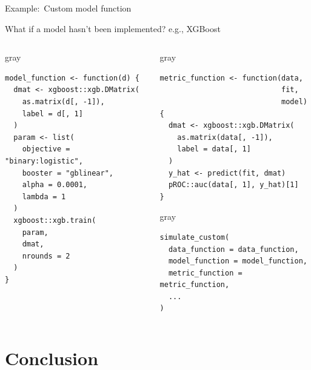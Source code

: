 \documentclass[11pt]{beamer}
\begin{document}
\begin{frame}[c,fragile]{Example:\ Custom model function}

	What if a model hasn't been implemented? e.g., XGBoost \vspace{-0.5em}%

	\begin{columns}
		\begin{column}[T]{0.5\textwidth}
			\begin{cbox}{gray}{}%
				\begin{verbatim}
model_function <- function(d) {
  dmat <- xgboost::xgb.DMatrix(
    as.matrix(d[, -1]),
    label = d[, 1]
  )
  param <- list(
    objective = "binary:logistic",
    booster = "gblinear",
    alpha = 0.0001,
    lambda = 1
  )
  xgboost::xgb.train(
    param,
    dmat,
    nrounds = 2
  )
}
            \end{verbatim}
			\end{cbox}

		\end{column}
		\begin{column}[T]{0.55\textwidth}
			\begin{cbox}{gray}{}%
				\begin{verbatim}
metric_function <- function(data,
                            fit,
                            model) {
  dmat <- xgboost::xgb.DMatrix(
    as.matrix(data[, -1]), 
    label = data[, 1]
  )
  y_hat <- predict(fit, dmat)
  pROC::auc(data[, 1], y_hat)[1]
}
            \end{verbatim}
			\end{cbox}

			\begin{cbox}{gray}{}%
				\begin{verbatim}
simulate_custom(
  data_function = data_function,
  model_function = model_function,
  metric_function = metric_function,
  ...
)
            \end{verbatim}
			\end{cbox}
		\end{column}
	\end{columns}

\end{frame}

\section{Conclusion}
\end{document}
